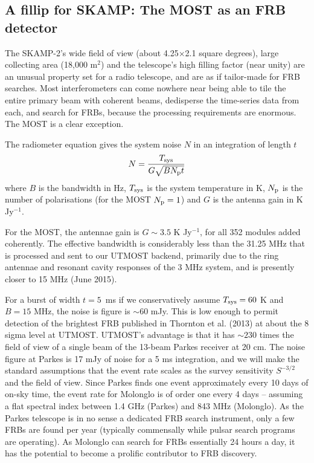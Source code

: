 \subsection{A fillip for SKAMP: The MOST as an FRB detector}

The SKAMP-2's wide field of view (about 4.25$\times$2.1 square degrees), large collecting area (18,000 m$^2$) and the telescope's high filling factor (near unity) are an unusual property set for a radio telescope, and are as if tailor-made for FRB searches. Most interferometers can come nowhere near being able to tile the entire primary beam with coherent beams, dedisperse the time-series data from each, and search for FRBs, because the processing requirements are enormous. The MOST is a clear exception.  

The radiometer equation gives the system noise $N$ in an integration of length $t$ 
\begin{equation}
N={{T_{\rm sys}}\over{G\sqrt{BN_{\rm p}t}}}
\end{equation}
\noindent where $B$ is the bandwidth in Hz, $T_{\rm sys}$ is the system temperature in K, $N_{\rm p}$ is the number of polarisations (for the MOST $N_{\rm p}=1$) and $G$ is the antenna gain in K Jy$^{-1}$. 

For the MOST, the antennae gain is $G\sim 3.5$ K Jy$^{-1}$, for all 352 modules added coherently. The effective bandwidth is considerably less than the 31.25 MHz that is processed and sent to our UTMOST backend, primarily due to the ring antennae and resonant cavity responses of the 3 MHz system, and is presently closer to 15 MHz (June 2015). 

For a burst of width $t=5$\, ms if we conservatively assume $T_{\rm sys} = 60$ K and $B = 15$ MHz, the noise is figure is $\sim 60$ mJy. This is low enough to permit detection of the brightest FRB published in Thornton et al. (2013) at about the 8 sigma level at UTMOST. UTMOST's advantage is that it has $\sim 230$ times the field of view of a single beam of the 13-beam Parkes receiver at 20 cm. The noise figure at Parkes is 17 mJy of noise for a 5 ms integration, and we will make the standard assumptions that the event rate scales as the survey sensitivity $S^{-3/2}$ and the field of view. Since Parkes finds one event approximately every 10 days of on-sky time, the event rate for Molonglo is of order one every 4 days -- assuming a flat spectral index between 1.4 GHz (Parkes) and 843 MHz (Molonglo). As the Parkes telescope is in no sense a dedicated FRB search instrument, only a few FRBs are found per year (typically commensally while pulsar search programs are operating). As Molonglo can search for FRBs essentially 24 hours a day, it has the potential to become a prolific contributor to FRB discovery. 

